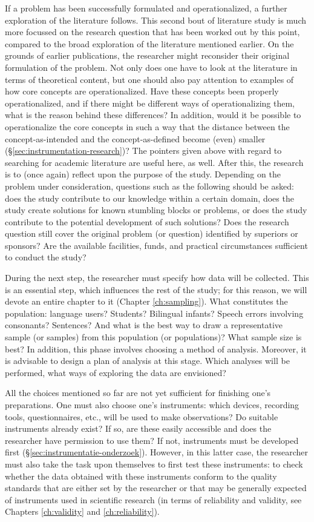 \documentclass[
]{book}
\begin{document}
If a problem has been successfully formulated and operationalized, a further exploration of the literature follows. This second bout of literature study is much more focussed on the research question that has been worked out by this point, compared to the broad exploration of the literature mentioned earlier. On the grounds of earlier publications, the researcher might reconsider their original formulation of the problem. Not only does one have to look at the literature in terms of theoretical content, but one should also pay attention to examples of how core concepts are operationalized. Have these concepts been properly operationalized, and if there might be different ways of operationalizing them, what is the reason behind these differences? In addition, would it be possible to operationalize the core concepts in such a way that the distance between the concept-as-intended and the concept-as-defined become (even) smaller (§\ref{sec:instrumentation-research})? The pointers given above with regard to searching for academic literature are useful here, as well. After this, the research is to (once again) reflect upon the purpose of the study. Depending on the problem under consideration, questions such as the following should be asked: does the study contribute to our knowledge within a certain domain, does the study create solutions for known stumbling blocks or problems, or does the study contribute to the potential development of such solutions? Does the research question still cover the original problem (or question) identified by superiors or sponsors? Are the available facilities, funds, and practical circumstances sufficient to conduct the study?

During the next step, the researcher must specify how data will be collected. This is an essential step, which influences the rest of the study; for this reason, we will devote an entire chapter to it (Chapter \ref{ch:sampling}). What constitutes the population: language users? Students? Bilingual infants? Speech errors involving consonants? Sentences? And what is the best way to draw a representative sample (or samples) from this population (or populations)? What sample size is best? In addition, this phase involves choosing a method of analysis. Moreover, it is advisable to design a plan of analysis at this stage. Which analyses will be performed, what ways of exploring the data are envisioned?

All the choices mentioned so far are not yet sufficient for finishing one's preparations. One must also choose one's instruments: which devices, recording tools, questionnaires, etc., will be used to make observations? Do suitable instruments already exist? If so, are these easily accessible and does the researcher have permission to use them? If not, instruments must be developed first (§\ref{sec:instrumentatie-onderzoek}). However, in this latter case, the researcher must also take the task upon themselves to first test these instruments: to check whether the data obtained with these instruments conform to the quality standards that are either set by the researcher or that may be generally expected of instruments used in scientific research (in terms of reliability and validity, see Chapters \ref{ch:validity} and \ref{ch:reliability}).
\end{document}
